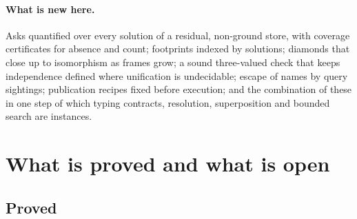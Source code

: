 \documentclass[11pt]{article}
\theoremstyle{remark}
\begin{document}
\paragraph{What is new here.} Asks quantified over every solution of a residual, non-ground store,
with coverage certificates for absence and count; footprints indexed by solutions; diamonds that close up
to isomorphism as frames grow; a sound three-valued check that keeps independence defined where
unification is undecidable; escape of names by query sightings; publication recipes fixed before
execution; and the combination of these in one step of which typing contracts, resolution,
superposition and bounded search are instances.

\section{What is proved and what is open}\label{sec:status}

\subsection{Proved}
\end{document}
